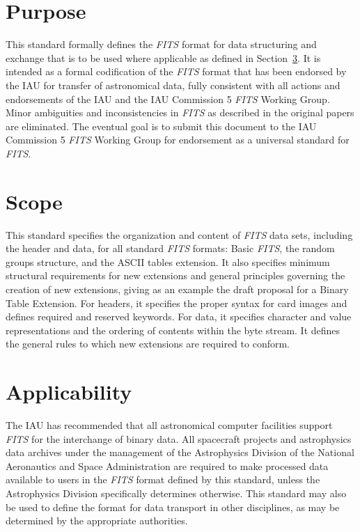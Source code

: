   \section{Purpose}
   This standard formally defines the {\em FITS\/} format 
   for data structuring and exchange that is to be used where 
   applicable as defined in Section~\ref{s:appl}. It is intended as a 
   formal codification of the {\em FITS\/} format that has been 
   endorsed by the IAU for transfer of astronomical data, fully 
   consistent with all actions and endorsements of the IAU and the 
   IAU Commission 5 {\em FITS\/} 
   Working Group.  Minor ambiguities and
   inconsistencies in {\em FITS\/} as described in the original papers are
   eliminated.  The eventual goal is to submit this document to the 
   IAU Commission 5 {\em FITS\/} 
   Working Group 
   for endorsement as a universal standard for {\em FITS}.
  
  \section{Scope}
   This standard specifies the organization and content of {\em FITS\/} data
   sets, including the header and data, for all 
   standard {\em FITS\/} formats: Basic {\em FITS}, the
   random groups structure, and the
   ASCII tables extension. 
   It also specifies minimum 
   structural requirements for new extensions
   and general principles governing the creation of 
   new extensions, giving as an example the draft proposal for a
   Binary Table
   Extension.  For headers, it specifies the 
   proper syntax for card images and defines 
   required 
   and reserved keywords.  For data, 
   it specifies character and value representations and the ordering 
   of contents within the byte stream.  It defines the general rules to which 
   new extensions are required to conform.
  
  \section{Applicability}
   \label{s:appl}
   The IAU has recommended that all astronomical computer 
   facilities support {\em FITS\/} for the interchange of binary data.
   All spacecraft projects and astrophysics data archives under the
   management of the Astrophysics Division of the National
   Aeronautics and Space Administration are required to make
   processed data available to users in the {\em FITS\/} format defined 
   by this standard, unless the Astrophysics Division specifically 
   determines otherwise.  This standard may also be used to define 
   the format for data transport in other disciplines, as may be 
   determined by the appropriate authorities.
  
